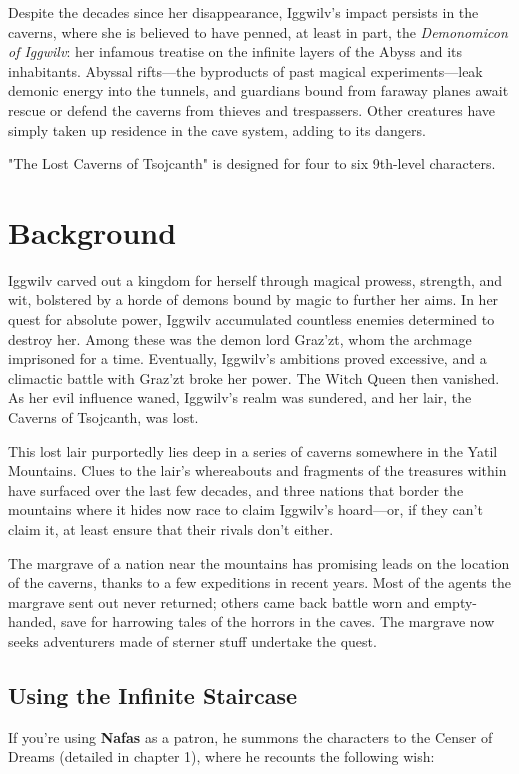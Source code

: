 \documentclass[10pt,a4paper,twoside,bg=print,twocolumn,openany,nodeprecatedcode]{dndbook}
\begin{document}
Despite the decades since her disappearance, Iggwilv's impact persists in the caverns, where she is believed to have penned, at least in part, the \textit{Demonomicon of Iggwilv}: her infamous treatise on the infinite layers of the Abyss and its inhabitants. Abyssal rifts—the byproducts of past magical experiments—leak demonic energy into the tunnels, and guardians bound from faraway planes await rescue or defend the caverns from thieves and trespassers. Other creatures have simply taken up residence in the cave system, adding to its dangers.

"The Lost Caverns of Tsojcanth" is designed for four to six 9th-level characters.

\section{Background}
Iggwilv carved out a kingdom for herself through magical prowess, strength, and wit, bolstered by a horde of demons bound by magic to further her aims. In her quest for absolute power, Iggwilv accumulated countless enemies determined to destroy her. Among these was the demon lord Graz'zt, whom the archmage imprisoned for a time. Eventually, Iggwilv's ambitions proved excessive, and a climactic battle with Graz'zt broke her power. The Witch Queen then vanished. As her evil influence waned, Iggwilv's realm was sundered, and her lair, the Caverns of Tsojcanth, was lost.

This lost lair purportedly lies deep in a series of caverns somewhere in the Yatil Mountains. Clues to the lair's whereabouts and fragments of the treasures within have surfaced over the last few decades, and three nations that border the mountains where it hides now race to claim Iggwilv's hoard—or, if they can't claim it, at least ensure that their rivals don't either.

The margrave of a nation near the mountains has promising leads on the location of the caverns, thanks to a few expeditions in recent years. Most of the agents the margrave sent out never returned; others came back battle worn and empty-handed, save for harrowing tales of the horrors in the caves. The margrave now seeks adventurers made of sterner stuff undertake the quest.

\subsection{Using the Infinite Staircase}
If you're using \textbf{Nafas} as a patron, he summons the characters to the Censer of Dreams (detailed in chapter 1), where he recounts the following wish:
\end{document}
